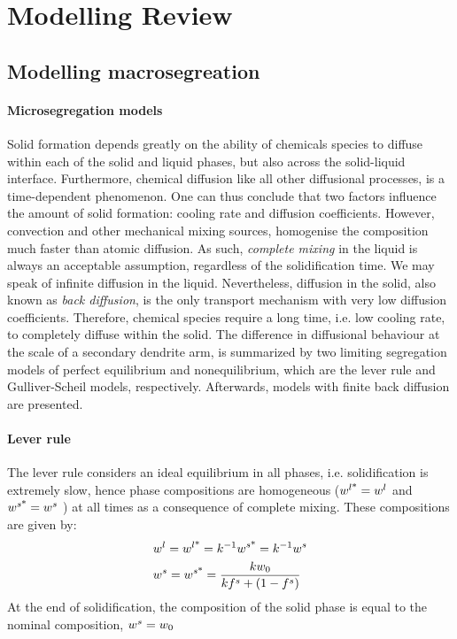 \chapter{Modelling Review}
\begin{nolinkcolors} 
\minitoc
\end{nolinkcolors}
\newpage

\section{Modelling macrosegreation}
%
\subsubsection{Microsegregation models}
Solid formation depends greatly on the ability of chemicals species to diffuse within each of 
the solid and liquid phases, but also across the solid-liquid interface. Furthermore, chemical diffusion like all other 
diffusional processes, is a time-dependent phenomenon. One can thus conclude that two factors
influence the amount of solid formation: cooling rate and diffusion coefficients. However, 
convection and other mechanical mixing sources, homogenise the composition much faster than atomic diffusion. 
As such, \emph{complete mixing} in the liquid is always an acceptable assumption, regardless of the 
solidification time. We may speak of infinite diffusion in the liquid. Nevertheless, diffusion in the solid, 
also known as \emph{back diffusion}, is the only transport mechanism with very low diffusion coefficients. 
Therefore, chemical species require a long time, i.e. low cooling rate, to completely diffuse within the solid.
The difference in diffusional behaviour at the scale of a secondary dendrite arm, is summarized by two limiting 
segregation models of perfect equilibrium  and nonequilibrium, which are the lever rule and Gulliver-Scheil models, respectively. 
Afterwards, models with finite back diffusion are presented. 
%
\subsubsection*{Lever rule}
The lever rule considers an ideal equilibrium in all phases, i.e. solidification is extremely slow, hence phase compositions are 
homogeneous ($ {w}^{l \text{*}}  = {w}^l$ and $ {w}^{s \text{*}}  = {w}^s$ ) at all times as a consequence of complete mixing. 
These compositions are given by:
\begin{align}
\label{eq:leverrule}
& {w}^l= {w}^{l \text{*}}  = k^{-1} {w}^{s \text{*}}  = k^{-1} {w}^s \\
& {w}^s= {w}^{s \text{*}}  = \frac{k {w}_0}{k{f^s} + (1-{f^s})}
\end{align}
At the end of solidification, the composition of the solid phase is equal to the nominal composition, ${w}^s = {w}_0$
%
